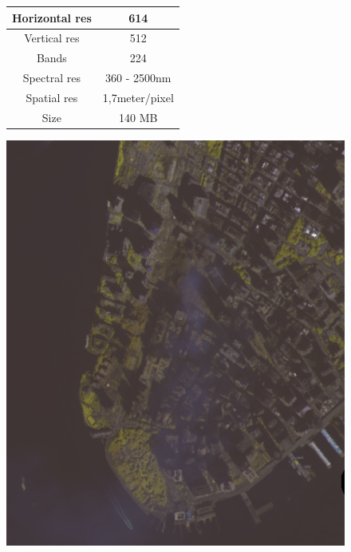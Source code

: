 \begin{figure}[!ht]
\begin{minipage}[t]{2.4in}
	\begin{tabular}[b]{c|c}\hline
      Horizontal res & 614 \\ \hline
      Vertical res & 512 \\ \hline
      Bands & 224 \\ \hline
      Spectral res & 360 - 2500nm \\ \hline
      Spatial res & 1,7meter/pixel \\ \hline
      Size & 140 MB\\ \hline
    \end{tabular}
\end{minipage}
\begin{minipage}[t]{0.28\linewidth}
\includegraphics[width=\linewidth]{figures/wtc_bad.png}
\end{minipage}
\begin{minipage}[t]{0.28\linewidth}

\end{minipage}
\end{figure}
